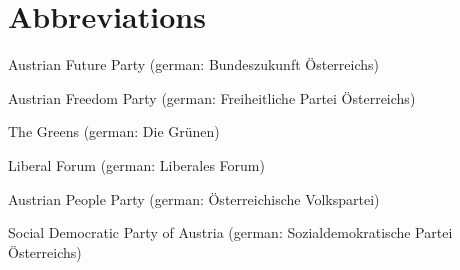 \chapter*{Abbreviations}

\begin{description}
\setlength{\itemsep}{-11pt}
\setlength{\leftmargin}{900pt}

\item[BZÖ] Austrian Future Party (german: Bundeszukunft Österreichs)

\item[FPÖ] Austrian Freedom Party (german: Freiheitliche Partei Österreichs)

\item[Grüne] The Greens (german: Die Grünen)

\item[Liberale] Liberal Forum (german: Liberales Forum)

\item[ÖVP] Austrian People Party (german: Österreichische Volkspartei)


\item[SPÖ] Social Democratic Party of Austria (german: Sozialdemokratische Partei Österreichs)

\end{description}
